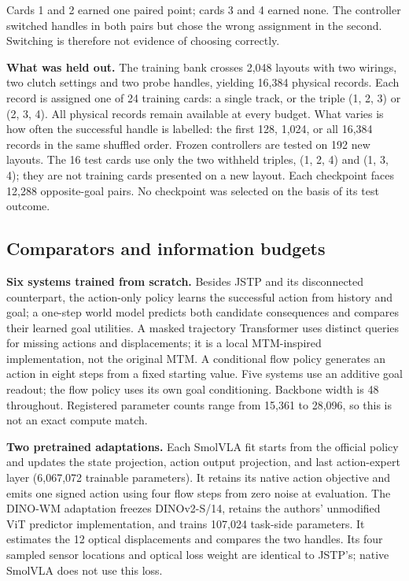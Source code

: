 \documentclass[11pt]{article}
\begin{document}
Cards 1 and 2 earned one paired point; cards 3 and 4 earned none. The controller switched handles in both pairs but chose the wrong assignment in the second. Switching is therefore not evidence of choosing correctly.

\textbf{What was held out.} The training bank crosses 2,048 layouts with two wirings, two clutch settings and two probe handles, yielding 16,384 physical records. Each record is assigned one of 24 training cards: a single track, or the triple (1, 2, 3) or (2, 3, 4). All physical records remain available at every budget. What varies is how often the successful handle is labelled: the first 128, 1,024, or all 16,384 records in the same shuffled order. Frozen controllers are tested on 192 new layouts. The 16 test cards use only the two withheld triples, (1, 2, 4) and (1, 3, 4); they are not training cards presented on a new layout. Each checkpoint faces 12,288 opposite-goal pairs. No checkpoint was selected on the basis of its test outcome.

\subsection{Comparators and information budgets}

\textbf{Six systems trained from scratch.} Besides JSTP and its disconnected counterpart, the action-only policy learns the successful action from history and goal; a one-step world model predicts both candidate consequences and compares their learned goal utilities. A masked trajectory Transformer uses distinct queries for missing actions and displacements; it is a local MTM-inspired implementation, not the original MTM. A conditional flow policy generates an action in eight steps from a fixed starting value. Five systems use an additive goal readout; the flow policy uses its own goal conditioning. Backbone width is 48 throughout. Registered parameter counts range from 15,361 to 28,096, so this is not an exact compute match.

\textbf{Two pretrained adaptations.} Each SmolVLA fit starts from the official policy and updates the state projection, action output projection, and last action-expert layer (6,067,072 trainable parameters). It retains its native action objective and emits one signed action using four flow steps from zero noise at evaluation. The DINO-WM adaptation freezes DINOv2-S/14, retains the authors' unmodified ViT predictor implementation, and trains 107,024 task-side parameters. It estimates the 12 optical displacements and compares the two handles. Its four sampled sensor locations and optical loss weight are identical to JSTP's; native SmolVLA does not use this loss.
\end{document}
